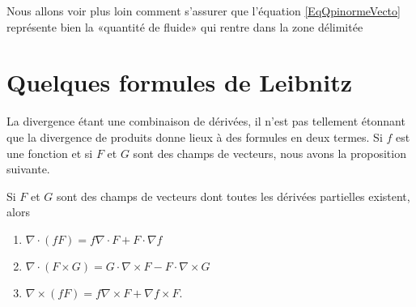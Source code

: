 \begin{remark}
	Nous allons voir plus loin comment s'assurer que l'équation \eqref{EqQpinormeVecto} représente bien la «quantité de fluide» qui rentre dans la zone délimitée
\end{remark}

\section{Quelques formules de Leibnitz}

La divergence étant une combinaison de dérivées, il n'est pas tellement étonnant que la divergence de produits donne lieux à des formules en deux termes. Si \( f\) est une fonction et si \( F\) et \( G\) sont des champs de vecteurs, nous avons la proposition suivante.

\begin{proposition}     \label{PROPooDMWEooNaJBCM}
	Si \( F\) et \( G\) sont des champs de vecteurs dont toutes les dérivées partielles existent, alors
	\begin{enumerate}
		\item
		      \( \nabla\cdot(fF)=f\nabla\cdot F+F\cdot\nabla f\)
		\item
		      \( \nabla\cdot(F\times G)=G\cdot\nabla\times F-F\cdot\nabla\times G\)
		\item       \label{ITEMooFDJIooKTnvKj}
		      \( \nabla\times(fF)=f\nabla\times F+\nabla f\times F\).
	\end{enumerate}
\end{proposition}

